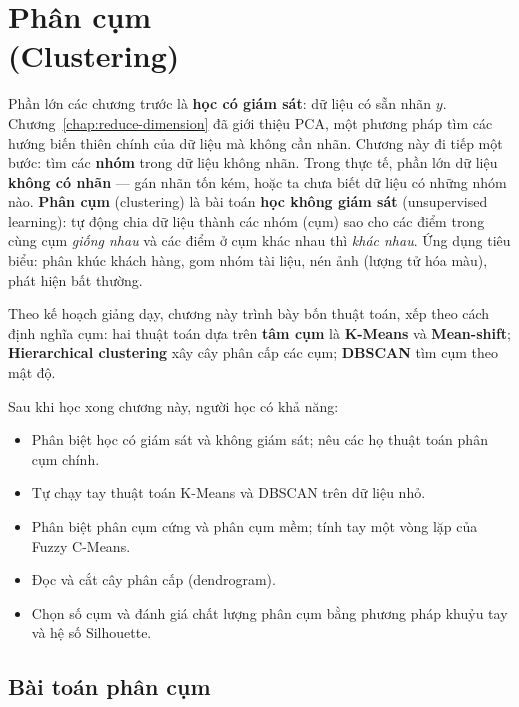 
\chapter{Phân cụm \\ (Clustering)}
\label{chap:clustering}

Phần lớn các chương trước là \textbf{học có giám sát}: dữ liệu có sẵn nhãn $y$. Chương~\ref{chap:reduce-dimension} đã giới thiệu PCA, một phương pháp tìm các hướng biến thiên chính của dữ liệu mà không cần nhãn. Chương này đi tiếp một bước: tìm các \textbf{nhóm} trong dữ liệu không nhãn. Trong thực tế, phần lớn dữ liệu \textbf{không có nhãn} --- gán nhãn tốn kém, hoặc ta chưa biết dữ liệu có những nhóm nào. \textbf{Phân cụm} (clustering) là bài toán \textbf{học không giám sát} (unsupervised learning): tự động chia dữ liệu thành các nhóm (cụm) sao cho các điểm trong cùng cụm \textit{giống nhau} và các điểm ở cụm khác nhau thì \textit{khác nhau}. Ứng dụng tiêu biểu: phân khúc khách hàng, gom nhóm tài liệu, nén ảnh (lượng tử hóa màu), phát hiện bất thường.

Theo kế hoạch giảng dạy, chương này trình bày bốn thuật toán, xếp theo cách định nghĩa cụm: hai thuật toán dựa trên \textbf{tâm cụm} là \textbf{K-Means} và \textbf{Mean-shift}; \textbf{Hierarchical clustering} xây cây phân cấp các cụm; \textbf{DBSCAN} tìm cụm theo mật độ.

\noindent Sau khi học xong chương này, người học có khả năng:
\begin{itemize}
    \item Phân biệt học có giám sát và không giám sát; nêu các họ thuật toán phân cụm chính.
    \item Tự chạy tay thuật toán K-Means và DBSCAN trên dữ liệu nhỏ.
    \item Phân biệt phân cụm cứng và phân cụm mềm; tính tay một vòng lặp của Fuzzy C-Means.
    \item Đọc và cắt cây phân cấp (dendrogram).
    \item Chọn số cụm và đánh giá chất lượng phân cụm bằng phương pháp khuỷu tay và hệ số Silhouette.
\end{itemize}

\section{Bài toán phân cụm}

